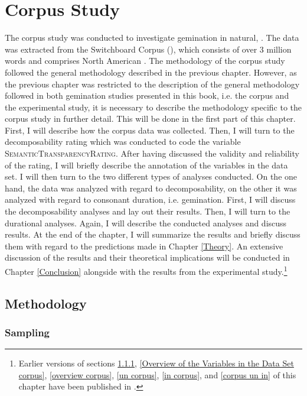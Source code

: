 \chapter {Corpus Study}
\label{Corpus Studies}


The corpus study was conducted to investigate {gemination} in natural, . 
The data was extracted from the Switchboard Corpus (\citealt{Godfrey.1997}), which consists of over 3 million words and comprises North American . 
The methodology of the corpus study followed the general methodology described in the previous chapter. However, as the previous chapter was restricted to the description of the general methodology followed in both {gemination} studies presented in this book, i.e. the corpus and the experimental study,  it is necessary to describe the methodology specific to the corpus study in further detail. This will be done in the first part of this chapter.
 First, I will describe how the corpus data was collected. Then, I will turn to the decomposability rating which was conducted to code the variable \textsc{SemanticTransparencyRating}. After having discussed the validity and reliability of the rating, I will briefly describe the annotation of the variables in the data set. I will then turn to the two different types of analyses conducted.
 On the one hand, the data was analyzed with regard to {decomposability}, on the other it was analyzed with regard to consonant duration, i.e. {gemination}. 
First, I will discuss the {decomposability} analyses and lay out their results. 
Then, I will turn to the durational analyses. Again, I will describe the conducted analyses and discuss results.  At the end of the chapter, I will summarize the results and briefly discuss them with regard to the predictions made in Chapter \ref{Theory}. An extensive discussion of the results and their theoretical implications will be conducted in Chapter \ref{Conclusion} alongside with the results from the experimental study.\footnote{Earlier versions of sections \ref{sampling corpus},  \ref{Overview of the Variables in the Data Set corpus}, \ref{overview corpus}, \ref{un corpus}, \ref{in corpus}, and \ref{corpus un in} of this chapter have been published in \cite{BenHedia.2017}.} 


\section{Methodology}

\subsection{Sampling}\label{sampling corpus}


